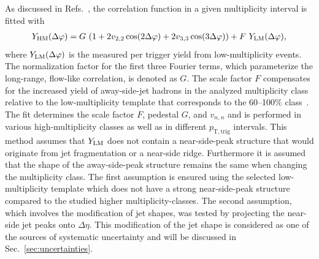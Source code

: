 As discussed in Refs.~\cite{ATLAS:2015hzw,ATLAS:2016yzd}, the correlation function in a given multiplicity interval is fitted with 
\begin{eqnarray}
\label{eq:narray}
Y_{\rm{HM}}(\Delta\varphi) = G~(1 + 2v_{2,2}\cos(2\Delta\varphi) + 2v_{3,3}\cos(3\Delta\varphi)) + F~Y_{\rm{LM}}(\Delta\varphi),
\label{eq:tmpfit}
\end{eqnarray}
where $Y_{\rm{LM}}(\Delta\varphi)$ is the measured per trigger yield from low-multiplicity events. The normalization factor for the first three Fourier terms, which parameterize the long-range, flow-like correlation, is denoted as $G$. The scale factor $F$ compensates for the increased yield of away-side-jet hadrons in the analyzed multiplicity class relative to the low-multiplicity template that corresponds to the 60--100\% class~\cite{ALICE:2013tla,ALICE:2014mas}.
The fit determines the scale factor $F$, pedestal $G$, and $v_{n,n}$ and is performed in various high-multiplicity classes as well as in different $p_\mathrm{T,trig}$ intervals. 
This method assumes that $Y_{\rm{LM}}$ does not contain a near-side-peak structure that would originate from jet fragmentation or a near-side ridge.
Furthermore it is assumed that the shape of the away-side-peak structure remains the same when changing the multiplicity class.
The first assumption is ensured using the selected low-multiplicity template which does not have a strong near-side-peak structure compared to the studied higher multiplicity-classes. The second assumption, which involves the modification of jet shapes, was tested by projecting the near-side jet peaks onto $\Delta\eta$. 
This modification of the jet shape is considered as one of the sources of systematic uncertainty and will be discussed in Sec.~\ref{sec:uncertainties}.

